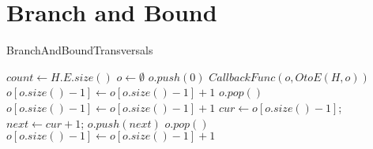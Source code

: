 \chapter{Branch and Bound}

\begin{algorithm}
	\caption{BranchAndBoundTransversals}\label{BranchAndBoundTransversals}
	\begin{algorithmic}[1]
		\State $count \gets H.E.size()$
		\State $o \gets \emptyset$
		\State $o.push(0)$
		 {}
		\State $CallbackFunc(o,OtoE(H,o))$
		\State $o[o.size()-1] \gets o[o.size()-1] +1$
		\Else
		\State $o.pop()$
		\State $o[o.size()-1] \gets o[o.size()-1] +1 $
		\EndIf
		\EndIf
		\Else
		\State $cur \gets o[o.size()-1]$;
		\State $next \gets cur + 1$;
		\State $o.push(next)$
		\Else
		\State $o.pop()$
		\State $o[o.size()-1] \gets o[o.size()-1] +1 $
		\EndIf
		\EndIf
		\EndIf
		\EndWhile
		\EndFunction
	\end{algorithmic}
\end{algorithm}